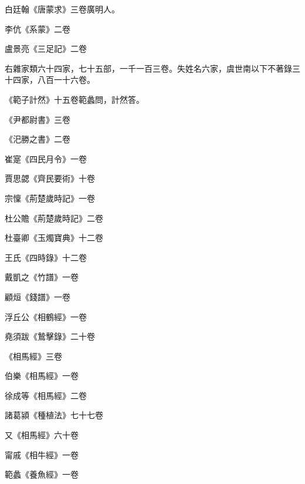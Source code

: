 \begin{pinyinscope}
 白廷翰《唐蒙求》三卷廣明人。



 李伉《系蒙》二卷



 盧景亮《三足記》二卷



 右雜家類六十四家，七十五部，一千一百三卷。失姓名六家，虞世南以下不著錄三十四家，八百一十六卷。



 《範子計然》十五卷範蠡問，計然答。



 《尹都尉書》三卷



 《汜勝之書》二卷



 崔寔《四民月令》一卷



 賈思勰《齊民要術》十卷



 宗懍《荊楚歲時記》一卷



 杜公贍《荊楚歲時記》二卷



 杜臺卿《玉燭寶典》十二卷



 王氏《四時錄》十二卷



 戴凱之《竹譜》一卷



 顧烜《錢譜》一卷



 浮丘公《相鶴經》一卷



 堯須跋《鷙擊錄》二十卷



 《相馬經》三卷



 伯樂《相馬經》一卷



 徐成等《相馬經》二卷



 諸葛潁《種植法》七十七卷



 又《相馬經》六十卷



 甯戚《相牛經》一卷



 範蠡《養魚經》一卷




\end{pinyinscope}
